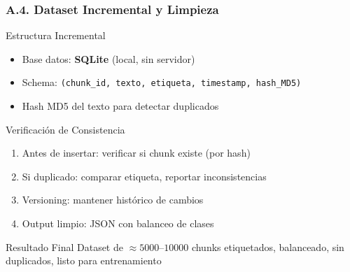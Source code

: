 \documentclass[aspectratio=169,10pt]{beamer}
\begin{document}
\begin{frame}
  \frametitle{A.4. Dataset Incremental y Limpieza}
  
  \begin{block}{Estructura Incremental}
    \begin{itemize}
      \item Base datos: \textbf{SQLite} (local, sin servidor)
      \item Schema: \texttt{(chunk\_id, texto, etiqueta, timestamp, hash\_MD5)}
      \item Hash MD5 del texto para detectar duplicados
    \end{itemize}
  \end{block}

  \begin{block}{Verificación de Consistencia}
    \begin{enumerate}
      \item Antes de insertar: verificar si chunk existe (por hash)
      \item Si duplicado: comparar etiqueta, reportar inconsistencias
      \item Versioning: mantener histórico de cambios
      \item Output limpio: JSON con balanceo de clases
    \end{enumerate}
  \end{block}

  \begin{block}{Resultado Final}
    Dataset de $\approx 5000$--$10000$ chunks etiquetados, balanceado, sin duplicados, listo para entrenamiento
  \end{block}
\end{frame}
\end{document}
